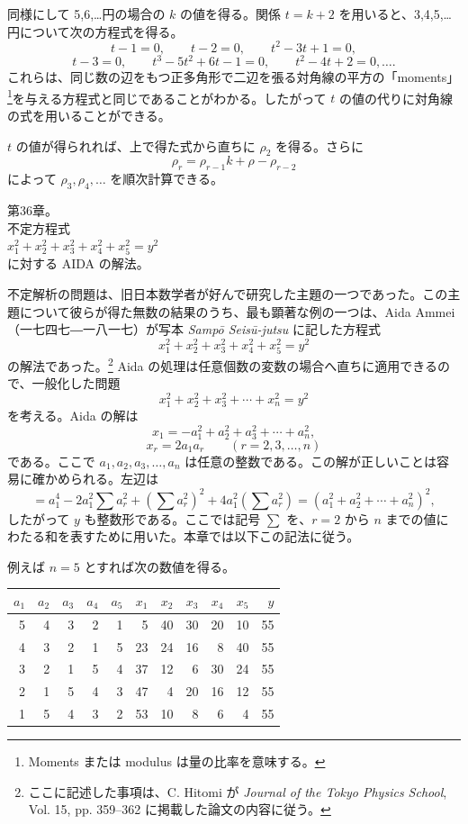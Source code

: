 \documentclass[11pt]{article}
\newcommand{\scanpage}[2]{\clearpage\setcounter{footnote}{0}\noindent{\footnotesize\color{gray}PDF #1 頁 · #2}\par\medskip}
\newcommand{\scanfooter}{}
\begin{document}
同様にして 5,6,\ldots 円の場合の $k$ の値を得る。関係 $t=k+2$ を用いると、3,4,5,\ldots 円について次の方程式を得る。
\[
t-1=0,\qquad t-2=0,\qquad t^2-3t+1=0,
\]
\[
t-3=0,\qquad t^3-5t^2+6t-1=0,\qquad t^2-4t+2=0,\ldots.
\]
これらは、同じ数の辺をもつ正多角形で二辺を張る対角線の平方の「moments」\footnote{Moments または modulus は量の比率を意味する。}を与える方程式と同じであることがわかる。したがって $t$ の値の代りに対角線の式を用いることができる。

$t$ の値が得られれば、上で得た式から直ちに $\rho_2$ を得る。さらに
\[
\rho_r=\rho_{r-1}k+\rho-\rho_{r-2}
\]
によって $\rho_3,\rho_4,\ldots$ を順次計算できる。
\scanfooter

\scanpage{0261}{第36章、印刷頁247}
\begin{center}
第36章。\\[1mm]
不定方程式\\
$x_1^2+x_2^2+x_3^2+x_4^2+x_5^2=y^2$\\
に対する AIDA の解法。
\end{center}

不定解析の問題は、旧日本数学者が好んで研究した主題の一つであった。この主題について彼らが得た無数の結果のうち、最も顕著な例の一つは、Aida Ammei（一七四七―一八一七）が写本 \emph{Sampō Seisū-jutsu} に記した方程式
\[
x_1^2+x_2^2+x_3^2+x_4^2+x_5^2=y^2
\]
の解法であった。\footnote{ここに記述した事項は、C. Hitomi が \emph{Journal of the Tokyo Physics School}, Vol. 15, pp. 359--362 に掲載した論文の内容に従う。} Aida の処理は任意個数の変数の場合へ直ちに適用できるので、一般化した問題
\[
x_1^2+x_2^2+x_3^2+\cdots+x_n^2=y^2
\]
を考える。Aida の解は
\[
x_1=-a_1^2+a_2^2+a_3^2+\cdots+a_n^2,
\]
\[
x_r=2a_1a_r\qquad(r=2,3,\ldots,n)
\]
である。ここで $a_1,a_2,a_3,\ldots,a_n$ は任意の整数である。この解が正しいことは容易に確かめられる。左辺は
\[
=a_1^4-2a_1^2\sum a_r^2+(\sum a_r^2)^2+4a_1^2(\sum a_r^2)
=(a_1^2+a_2^2+\cdots+a_n^2)^2,
\]
したがって $y$ も整数形である。ここでは記号 $\sum$ を、$r=2$ から $n$ までの値にわたる和を表すために用いた。本章では以下この記法に従う。

例えば $n=5$ とすれば次の数値を得る。
\begin{center}
\small
\begin{tabular}{|r|r|r|r|r||r|r|r|r|r|r|}
\hline
$a_1$&$a_2$&$a_3$&$a_4$&$a_5$&$x_1$&$x_2$&$x_3$&$x_4$&$x_5$&$y$\\
\hline
5&4&3&2&1&5&40&30&20&10&55\\
4&3&2&1&5&23&24&16&8&40&55\\
3&2&1&5&4&37&12&6&30&24&55\\
2&1&5&4&3&47&4&20&16&12&55\\
1&5&4&3&2&53&10&8&6&4&55\\
\hline
\end{tabular}
\end{center}
\scanfooter
\end{document}
